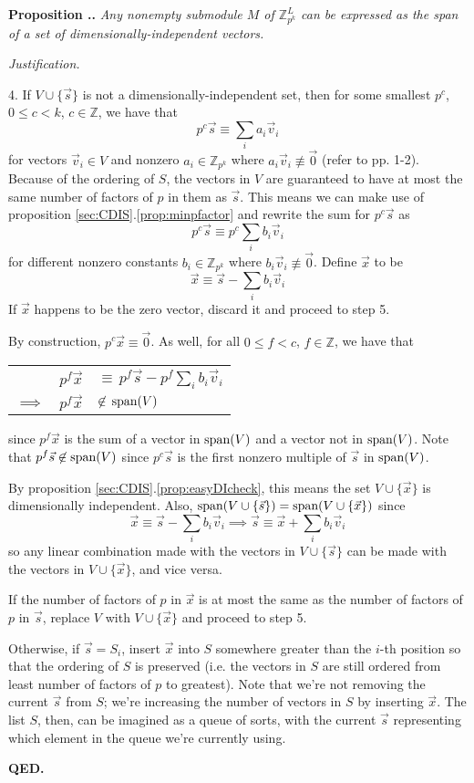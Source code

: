 \documentclass[a4paper, 12pt, reqno]{amsart}
\newcommand\vecspan[1]{\textup{span}(#1)}
\newcounter{propcounter}[section]
\newenvironment{proposition}[1]
{
	\refstepcounter{propcounter}
	\textbf{Proposition \thesection.\thepropcounter.} \emph{#1}
	
	\emph{Justification.}
}
{
	\textbf{QED.} \\
}
\begin{document}
\begin{proposition}{Any nonempty submodule $M$ of $\mathds{Z}_{p^k}^L$ can be expressed as the span of a set of dimensionally-independent vectors.}
			4. If $V \cup \{\vec{s}\}$ is not a dimensionally-independent set, then for some smallest $p^c$, $0 \leq c < k$, $c \in \mathds{Z}$, we have that
			\[
				p^c\vec{s} \equiv \sum_i a_i\vec{v}_i
			\]
			for vectors $\vec{v}_i \in V$ and nonzero $a_i \in \mathds{Z}_{p^k}$ where $a_i\vec{v}_i \not\equiv \vec{0}$ (refer to pp. 1-2). Because of the ordering of $S$, 
			the vectors in $V$ are guaranteed to have at most the same number of factors of $p$ in them as $\vec{s}$. This means we can make use of proposition 
			\ref{sec:CDIS}.\ref{prop:minpfactor} and rewrite the sum for $p^c\vec{s}$ as
			\[
				p^c\vec{s} \equiv p^c\sum_i b_i\vec{v}_i
			\]
			for different nonzero constants $b_i \in \mathds{Z}_{p^k}$ where $b_i\vec{v}_i \not\equiv \vec{0}$. Define $\vec{x}$ to be
			\[
				\vec{x} \equiv \vec{s} - \sum_i b_i\vec{v}_i
			\]
			If $\vec{x}$ happens to be the zero vector, discard it and proceed to step 5. 
			
			By construction, $p^c\vec{x} \equiv \vec{0}$. As well, for all $0 \leq f < c$, $f \in \mathds{Z}$, we have that
			\begin{center}
				\begin{tabular}{*{3}{l}}
							   & $p^f\vec{x}$ & $\equiv\, p^f\vec{s} - p^f\sum_i b_i\vec{v}_i$ \\
					$\implies$ & $p^f\vec{x}$ & $\not\in\, \vecspan{V}$
				\end{tabular}
			\end{center}
			since $p^f\vec{x}$ is the sum of a vector in $\vecspan{V}$ and a vector not in $\vecspan{V}$. Note that $p^f\vec{s} \not\in \vecspan{V}$ since $p^c\vec{s}$ is 
			the first nonzero multiple of $\vec{s}$ in $\vecspan{V}$.
			
			By proposition \ref{sec:CDIS}.\ref{prop:easyDIcheck}, this means the set $V \cup \{\vec{x}\}$ is dimensionally independent. Also, 
			$\vecspan{V \cup \{\vec{s}\}} = \vecspan{V \cup \{\vec{x}\}}$ since
			\[
				\vec{x} \equiv \vec{s} - \sum_i b_i\vec{v}_i \implies \vec{s} \equiv \vec{x} + \sum_i b_i\vec{v}_i
			\]
			so any linear combination made with the vectors in $V \cup \{\vec{s}\}$ can be made with the vectors in $V \cup \{\vec{x}\}$, and vice versa.
			
			If the number of factors of $p$ in $\vec{x}$ is at most the same as the number of factors of $p$ in $\vec{s}$, replace $V$ with $V \cup \{\vec{x}\}$ and proceed 
			to step 5. 
			
			Otherwise, if $\vec{s} = S_i$, insert $\vec{x}$ into $S$ somewhere greater than the $i$-th position so that the ordering of $S$ is preserved (i.e. the 
			vectors in $S$ are still ordered from least number of factors of $p$ to greatest). Note that we're not removing the current $\vec{s}$ from $S$; we're 
			increasing the number of vectors in $S$ by inserting $\vec{x}$. The list $S$, then, can be imagined as a queue of sorts, with the current $\vec{s}$ representing 
			which element in the queue we're currently using.
			

\end{proposition}
\end{document}
